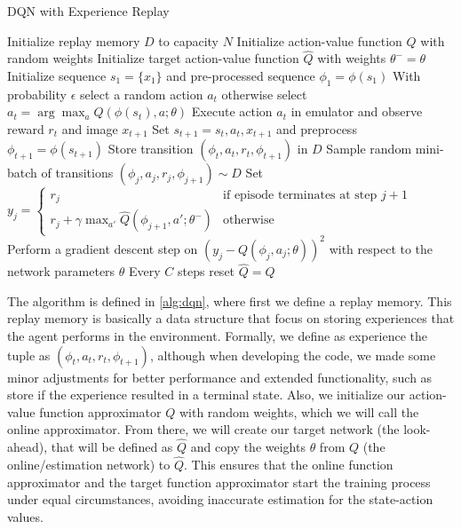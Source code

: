 \begin{algorithm}
	\caption{DQN with Experience Replay}
	\label{alg:dqn}
	\begin{algorithmic}[1]
		\State Initialize replay memory $D$ to capacity $N$
		\State Initialize action-value function $Q$ with random weights
		\State Initialize target action-value function $\hat{Q}$ with weights $\theta^{-} = \theta$
		\State Initialize sequence $s_1 = \{x_1\}$ and pre-processed sequence $\phi_1 = \phi(s_1)$
		\State With probability $\epsilon$ select a random action $a_t$
		\State otherwise select $a_t = \arg\max_a Q(\phi(s_t), a; \theta)$
		\State Execute action $a_t$ in emulator and observe reward $r_t$ and image $x_{t+1}$
		\State Set $s_{t+1} = s_t, a_t, x_{t+1}$ and preprocess $\phi_{t+1} = \phi(s_{t+1})$
		\State Store transition $(\phi_t, a_t, r_t, \phi_{t+1})$ in $D$
		\State Sample random mini-batch of transitions $(\phi_j, a_j, r_j, \phi_{j+1}) \sim D$
		\State Set $y_j = 
		\begin{cases} 
			r_j & \text{if episode terminates at step } j+1 \\
			r_j + \gamma \max_{a'} \hat{Q}(\phi_{j+1}, a'; \theta^{-}) & \text{otherwise}
		\end{cases}$
		\State Perform a gradient descent step on $(y_j - Q(\phi_j, a_j; \theta))^2$ with respect to the network parameters $\theta$
		\State Every $C$ steps reset $\hat{Q} = Q$
		\EndFor
		\EndFor
	\end{algorithmic}
	
\end{algorithm}

The algorithm is defined in \ref{alg:dqn}, where first we define a replay memory. This replay memory is basically a data structure that focus on storing experiences that the agent performs in the environment. Formally, we define as experience the tuple as $(\phi_t, a_t, r_t, \phi_{t+1})$, although when developing the code, we made some minor adjustments for better performance and extended functionality, such as store if the experience resulted in a terminal state. Also, we initialize our action-value function approximator $Q$ with random weights, which we will call the online approximator. From there, we will create our target network (the look-ahead), that will be defined as $\hat{Q}$ and copy the weights $\theta$ from $Q$ (the online/estimation network) to $\hat{Q}$. This ensures that the online function approximator and the target function approximator start the training process under equal circumstances, avoiding inaccurate estimation for the state-action values.

